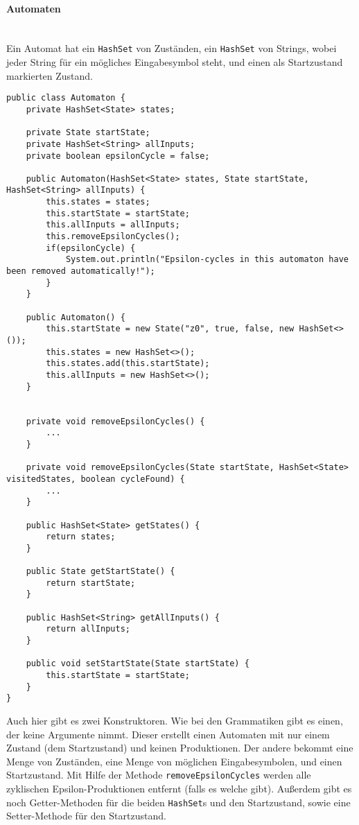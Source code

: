 \paragraph{Automaten}\ \\
Ein Automat hat ein \lstinline[columns=fixed]{HashSet} von Zuständen, ein \lstinline[columns=fixed]{HashSet} von Strings, wobei jeder String für ein mögliches Eingabesymbol steht, und einen als Startzustand markierten Zustand.
\begin{lstlisting}[frame=single, basicstyle=\small, caption=Die Klasse \textit{Automaton}]
public class Automaton {
	private HashSet<State> states;
	
	private State startState;
	private HashSet<String> allInputs;
	private boolean epsilonCycle = false;
	
	public Automaton(HashSet<State> states, State startState, HashSet<String> allInputs) {
		this.states = states;
		this.startState = startState;
		this.allInputs = allInputs;
		this.removeEpsilonCycles();
		if(epsilonCycle) {
			System.out.println("Epsilon-cycles in this automaton have been removed automatically!");
		}
	}
	
	public Automaton() {
		this.startState = new State("z0", true, false, new HashSet<>());
		this.states = new HashSet<>();
		this.states.add(this.startState);
		this.allInputs = new HashSet<>();
	}
	
	
	private void removeEpsilonCycles() {
		...
	}
	
	private void removeEpsilonCycles(State startState, HashSet<State> visitedStates, boolean cycleFound) {
		...
	}
	
	public HashSet<State> getStates() {
		return states;
	}
	
	public State getStartState() {
		return startState;
	}
	
	public HashSet<String> getAllInputs() {
		return allInputs;
	}
	
	public void setStartState(State startState) {
		this.startState = startState;
	}
}
\end{lstlisting}
Auch hier gibt es zwei Konstruktoren. Wie bei den Grammatiken gibt es einen, der keine Argumente nimmt. Dieser erstellt einen Automaten mit nur einem Zustand (dem Startzustand) und keinen Produktionen. Der andere bekommt eine Menge von Zuständen, eine Menge von möglichen Eingabesymbolen, und einen Startzustand. Mit Hilfe der Methode \lstinline[columns=fixed]{removeEpsilonCycles} werden alle zyklischen Epsilon-Produktionen entfernt (falls es welche gibt). Außerdem gibt es noch Getter-Methoden für die beiden \lstinline[columns=fixed]{HashSet}s und den Startzustand, sowie eine Setter-Methode für den Startzustand.\\
